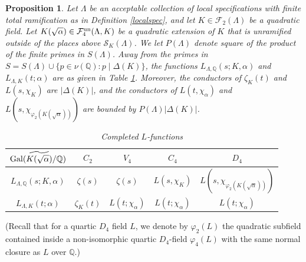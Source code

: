 \documentclass[10pt]{article}
\theoremstyle{plain}
\newtheorem{proposition}[thm]{Proposition}
\theoremstyle{definition}
\theoremstyle{remark}
\def\Gal{{\rm Gal}}
\def\un{{\rm un}}
\def\val{{\nu}}
\def\Q{{\mathbb Q}}
\def\Q{{\mathbb Q}}
\def\bQ{{\mathbb Q}}
\def\cF{{\mathcal F}}
\def\bQ{{\mathbb Q}}
\def\cS{{\mathcal S}}
\begin{document}
\begin{proposition}\label{lemLQpole}
Let $\Lambda$ be an acceptable collection of local 
specifications with finite total ramification as in Definition \ref{localspec}, and let $K \in
\cF_2(\Lambda)$ be a quadratic field. Let $K(\sqrt{\alpha}) \in
\cF_4^{\un}(\Lambda,K)$ be a quadratic extension of $K$ that is
unramified outside of the places above $\cS_K(\Lambda)$.  We let $P(\Lambda)$ denote square
of the product of the finite primes in $S(\Lambda)$.  Away from the primes in $S=S(\Lambda) \cup \{p \in
\val(\bQ) : p \mid \Delta(K)\}$, the functions
$L_{\Lambda,\Q}(s;K,\alpha)$ and $L_{\Lambda,K}(t;\alpha)$ are as
given in Table \ref{table}. Moreover, the conductors of $\zeta_K(t)$
and $L(s,\chi_K)$ are $|\Delta(K)|$, and the conductors of
$L(t,\chi_\alpha)$ and $L(s,\chi_{\varphi_2(K(\sqrt{\alpha}))})$ are
bounded by $P(\Lambda)|\Delta(K)|$.
\begin{table}[ht]
\centering
\begin{tabular}{|c | c| c| c|c|}
\hline $\Gal(\widetilde{K(\sqrt{\alpha})}/\bQ)$ & $C_2$ & $V_4$ &
$C_4$ & $D_4$\\
\hline \hline
$L_{\Lambda,\Q}(s;K,\alpha)$ & $\zeta(s)$ & $\zeta(s)$ &
$L(s,\chi_K)$ &
$L(s,\chi_{\varphi_2(K(\sqrt{\alpha}))})$\\
\hline
$L_{\Lambda,K}(t;\alpha)$ & $\zeta_K(t)$ &
$L(t;\chi_\alpha)$ &
$L(t;\chi_\alpha)$ &
$L(t;\chi_\alpha)$ \\
\hline
\end{tabular}
\caption{Completed $L$-functions}\label{table}
\end{table}
\end{proposition}
(Recall that for a quartic $D_4$
field $L$, we denote by $\varphi_2(L)$ the quadratic subfield
contained inside a non-isomorphic quartic $D_4$-field $\varphi_4(L)$
with the same normal closure as $L$ over $\bQ$.)
\end{document}
